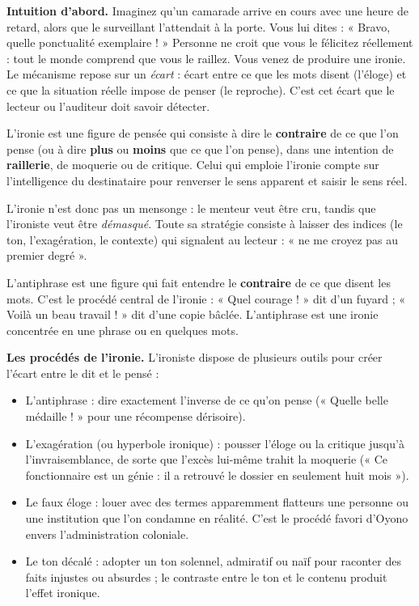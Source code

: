 \documentclass[11pt]{article}
\newcommand{\cle}[1]{{\popxbold\color{popdark}#1}}
\newcounter{popsec}
\newcounter{popsub}
\newcommand{\courssub}[1]{%
  \stepcounter{popsub}%
  \par\vspace{9pt}\noindent{\popxbold\fontsize{11.5}{13}\selectfont\color{popink}{\color{poporange}\thepopsec.\thepopsub}\hspace{6pt}#1}\par\nopagebreak\vspace{4pt}
}
\begin{document}
\courssub{L'ironie : dire le contraire de ce qu'on pense}

\textbf{Intuition d'abord.} Imaginez qu'un camarade arrive en cours avec une heure de retard, alors que le surveillant l'attendait à la porte. Vous lui dites : « Bravo, quelle ponctualité exemplaire ! » Personne ne croit que vous le félicitez réellement : tout le monde comprend que vous le raillez. Vous venez de produire une \cle{ironie}. Le mécanisme repose sur un \emph{écart} : écart entre ce que les mots disent (l'éloge) et ce que la situation réelle impose de penser (le reproche). C'est cet écart que le lecteur ou l'auditeur doit savoir détecter.

\begin{definition}[L'ironie]
L'\cle{ironie} est une figure de pensée qui consiste à dire le \textbf{contraire} de ce que l'on pense (ou à dire \textbf{plus} ou \textbf{moins} que ce que l'on pense), dans une intention de \textbf{raillerie}, de moquerie ou de critique. Celui qui emploie l'ironie compte sur l'intelligence du destinataire pour renverser le sens apparent et saisir le sens réel.
\end{definition}

L'ironie n'est donc pas un mensonge : le menteur veut être cru, tandis que l'ironiste veut être \emph{démasqué}. Toute sa stratégie consiste à laisser des indices (le ton, l'exagération, le contexte) qui signalent au lecteur : « ne me croyez pas au premier degré ».

\begin{definition}[L'antiphrase]
L'\cle{antiphrase} est une figure qui fait entendre le \textbf{contraire} de ce que disent les mots. C'est le procédé central de l'ironie : « Quel courage ! » dit d'un fuyard ; « Voilà un beau travail ! » dit d'une copie bâclée. L'antiphrase est une ironie concentrée en une phrase ou en quelques mots.
\end{definition}

\textbf{Les procédés de l'ironie.} L'ironiste dispose de plusieurs outils pour créer l'écart entre le dit et le pensé :

\begin{itemize}
\item L'\cle{antiphrase} : dire exactement l'inverse de ce qu'on pense (« Quelle belle médaille ! » pour une récompense dérisoire).
\item L'\cle{exagération} (ou hyperbole ironique) : pousser l'éloge ou la critique jusqu'à l'invraisemblance, de sorte que l'excès lui-même trahit la moquerie (« Ce fonctionnaire est un génie : il a retrouvé le dossier en seulement huit mois »).
\item Le \cle{faux éloge} : louer avec des termes apparemment flatteurs une personne ou une institution que l'on condamne en réalité. C'est le procédé favori d'Oyono envers l'administration coloniale.
\item Le \cle{ton décalé} : adopter un ton solennel, admiratif ou naïf pour raconter des faits injustes ou absurdes ; le contraste entre le ton et le contenu produit l'effet ironique.
\end{itemize}
\end{document}
